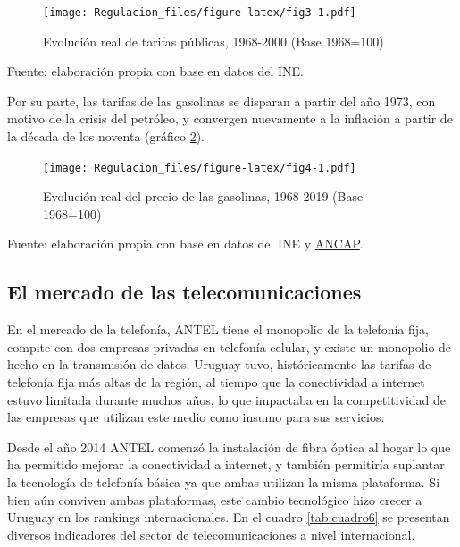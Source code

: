 \documentclass[
  12pt,
  spanish,
]{book}
\begin{document}
\begin{figure}
\centering
\texttt{[image: Regulacion\_files/figure-latex/fig3-1.pdf]}
\caption{\label{fig:fig3}Evolución real de tarifas públicas, 1968-2000 (Base 1968=100)}
\end{figure}

Fuente: elaboración propia con base en datos del INE.

Por su parte, las tarifas de las gasolinas se disparan a partir del año 1973, con motivo de la crisis del petróleo, y convergen nuevamente a la inflación a partir de la década de los noventa (gráfico \ref{fig:fig4}).\\

\begin{figure}
\centering
\texttt{[image: Regulacion\_files/figure-latex/fig4-1.pdf]}
\caption{\label{fig:fig4}Evolución real del precio de las gasolinas, 1968-2019 (Base 1968=100)}
\end{figure}

Fuente: elaboración propia con base en datos del INE y \href{https://www.ancap.com.uy/innovaportal/v/6088/1/innova.front/historico-precio-combustibles.html}{ANCAP}.

\hypertarget{el-mercado-de-las-telecomunicaciones}{%
\subsection{El mercado de las telecomunicaciones}\label{el-mercado-de-las-telecomunicaciones}}

En el mercado de la telefonía, ANTEL tiene el monopolio de la telefonía fija, compite con dos empresas privadas en telefonía celular, y existe un monopolio de hecho en la transmisión de datos. Uruguay tuvo, históricamente las tarifas de telefonía fija más altas de la región, al tiempo que la conectividad a internet estuvo limitada durante muchos años, lo que impactaba en la competitividad de las empresas que utilizan este medio como insumo para sus servicios.

Desde el año 2014 ANTEL comenzó la instalación de fibra óptica al hogar lo que ha permitido mejorar la conectividad a internet, y también permitiría suplantar la tecnología de telefonía básica ya que ambas utilizan la misma plataforma. Si bien aún conviven ambas plataformas, este cambio tecnológico hizo crecer a Uruguay en los rankings internacionales. En el cuadro \ref{tab:cuadro6} se presentan diversos indicadores del sector de telecomunicaciones a nivel internacional.
\end{document}
